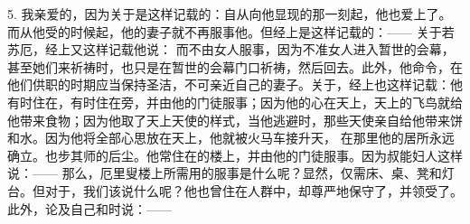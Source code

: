 5. 我亲爱的，因为关于是这样记载的：自从向他显现的那一刻起，他也爱上了。而从他受的时候起，他的妻子就不再服事他。但经上是这样记载的：——  关于若苏厄，经上又这样记载他说：  而不由女人服事，因为不准女人进入暂世的会幕，甚至她们来祈祷时，也只是在暂世的会幕门口祈祷，然后回去。此外，他命令，在他们供职的时期应当保持圣洁，不可亲近自己的妻子。关于，经上也这样记载：他有时住在，有时住在旁，并由他的门徒服事；因为他的心在天上，天上的飞鸟就给他带来食物；因为他取了天上天使的样式，当他逃避时，那些天使亲自给他带来饼和水。因为他将全部心思放在天上，他就被火马车接升天， 在那里他的居所永远确立。也步其师的后尘。他常住在的楼上，并由他的门徒服事。因为叔能妇人这样说：——  那么，厄里叟楼上所需用的服事是什么呢？显然，仅需床、桌、凳和灯台。但对于，我们该说什么呢？他也曾住在人群中，却尊严地保守了，并领受了。此外，论及自己和时说：—— \par

